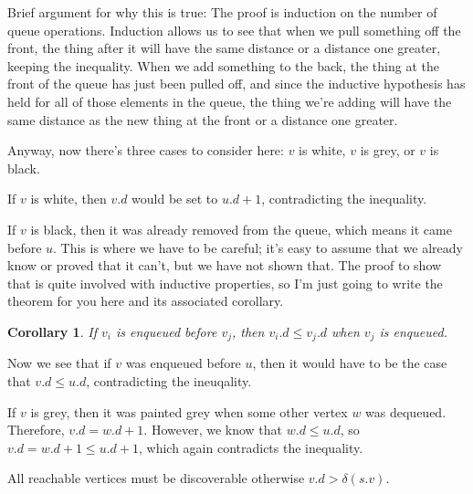 \documentclass[]{article}
\newtheorem{corollary}[]{Corollary}
\begin{document}
Brief argument for why this is true: The proof is induction on the number of queue operations. Induction allows us to see that when we pull something off the front, the thing after it will have the same distance or a distance one greater, keeping the inequality. When we add something to the back, the thing at the front of the queue has just been pulled off, and since the inductive hypothesis has held for all of those elements in the queue, the thing we're adding will have the same distance as the new thing at the front or a distance one greater. 

Anyway, now there's three cases to consider here: $v$ is white, $v$ is grey, or $v$ is black. 

If $v$ is white, then $v.d$ would be set to $u.d + 1$, contradicting the inequality. 

If $v$ is black, then it was already removed from the queue, which means it came before $u$. This is where we have to be careful; it's easy to assume that we already know or proved that it can't, but we have not shown that. The proof to show that is quite involved with inductive properties, so I'm just going to write the theorem for you here and its associated corollary. 

\begin{corollary}
    If $v_i$ is enqueued before $v_j$, then $v_i.d \leq v_j.d$ when $v_j$ is enqueued. 
\end{corollary}

Now we see that if $v$ was enqueued before $u$, then it would have to be the case that $v.d \leq u.d$, contradicting the ineuqality. 

If $v$ is grey, then it was painted grey when some other vertex $w$ was dequeued. Therefore, $v.d = w.d + 1$. However, we know that $w.d \leq u.d$, so $v.d = w.d + 1 \leq u.d + 1$, which again contradicts the inequality. 

All reachable vertices must be discoverable otherwise $v.d > \delta(s.v)$. 
\end{document}
